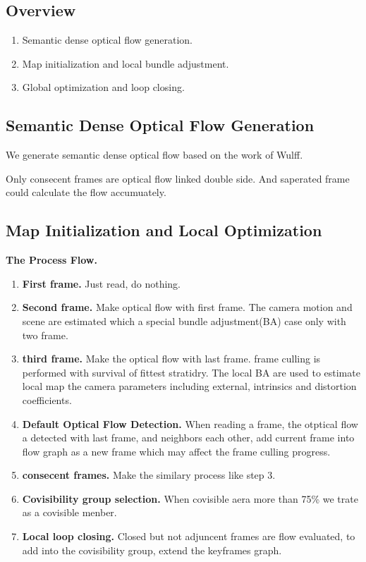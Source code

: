 \documentclass{article}
\begin{document}
\subsection{Overview}


\begin{enumerate}
\item Semantic dense optical flow generation.
\item Map initialization and local bundle adjustment.
\item Global optimization and loop closing.
\end{enumerate}

\subsection{Semantic Dense Optical Flow Generation}

We generate semantic dense optical flow based on the work of Wulff.  \cite{Wulff2017Optical}\par

Only consecent frames are optical flow linked double side. And saperated frame could calculate the flow accumuately.

\subsection{Map Initialization and Local Optimization}

\textbf{The Process Flow.}

\begin{enumerate}

\item \textbf{First frame.} Just read, do nothing.
\item \textbf{Second frame.} Make optical flow with first frame. The camera motion and scene are estimated which a special bundle adjustment(BA) case only with two frame.
\item \textbf{third frame.} Make the optical flow with last frame. frame culling is performed with survival of fittest stratidry. The local BA are used to estimate local map the camera parameters including external, intrinsics and distortion coefficients.

\item \textbf{Default Optical Flow Detection.} When reading a frame, the otptical flow a detected with last frame, and neighbors each other, add current frame into flow graph as a new frame which may affect the frame culling progress.

\item \textbf{consecent frames.} Make the similary process like step 3.
\item \textbf{Covisibility group selection.} When covisible aera more than 75\% we trate as a covisible menber.

\item \textbf{Local loop closing.} Closed but not adjuncent frames are flow evaluated, to add into the covisibility group, extend the keyframes graph.

\end{enumerate}
\end{document}
